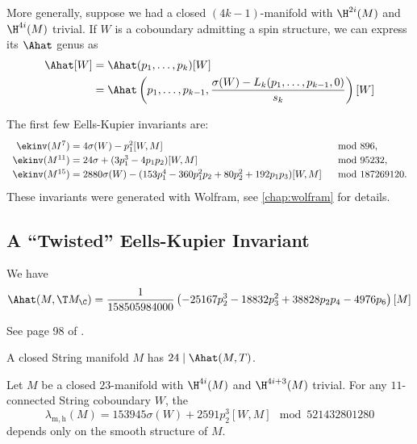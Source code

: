 More generally, suppose we had a closed $(4k-1)$-manifold with $\H^{2i}(M)$ and $\H^{4i}(M)$ trivial. If $W$ is a coboundary admitting a spin structure, we can express its $\Ahat$ genus as
\[
	\begin{aligned}
	\Ahat[W]&=\Ahat(p_1,\ldots, p_k)[W]\\
					&=\Ahat\left(p_1, \ldots, p_{k-1}, \frac{\sigma(W)-L_k(p_1,\ldots, p_{k-1},0)}{s_k}\right)[W]
	\end{aligned}
\]

\begin{example}
	The first few Eells-Kupier invariants are:
	\[
		\renewcommand{\arraystretch}{1.2}
		\begin{array}{r@{\;}ll}
			\ekinv(M^7)
			 & = 4\sigma(W) - p_1^2[W, M]
			 & \mod 896,                                                        \\
			\ekinv(M^{11})
			 & = 24\sigma + (3p_1^3-4p_1p_2)[W,M]
			 & \mod 95232,                                                       \\
			\ekinv(M^{15})
			 & = 2880\sigma(W) - (153p_1^4-360p_1^2p_2+80p_2^2+192p_1p_3)[W,M]
			 & \mod 187269120.
		\end{array}
	\]
	These invariants were generated with Wolfram, see \cref{chap:wolfram} for details.
\end{example}


\subsection{A ``Twisted'' Eells-Kupier Invariant}

\begin{definition}
	We have
	\[
		\Ahat(M,\T M_\C) = \frac{1}{158505984000}\left(-25167p_2^3 - 18832p_3^2 + 38828p_2p_4 - 4976p_6\right)[M]
	\]
\end{definition}
See page 98 of \cite{hopkinsmahowald2002bo8}.


\begin{theorem}
	A closed String manifold $M$ has $24\mid \Ahat(M,T)$.
\end{theorem}

\begin{corollary}
	Let $M$ be a closed $23$-manifold with $\H^{4i}(M)$ and $\H^{4i+3}(M)$ trivial. For any $11$-connected String coboundary $W$, the 
	\[
		\lambda_{\mathrm{m,h}}(M) = 153945\sigma(W) + 2591p_2^3[W,M]\mod 521432801280
	\]
	depends only on the smooth structure of $M$.
\end{corollary}

